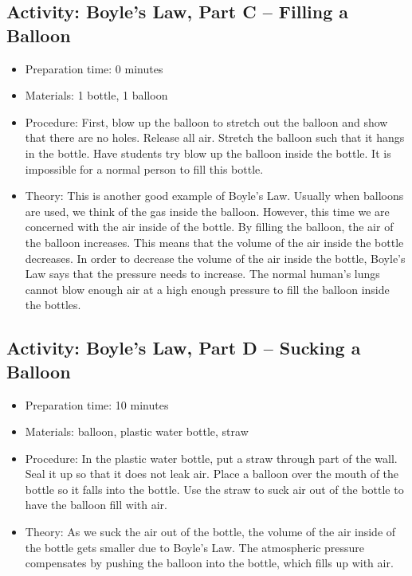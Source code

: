 \begin{itemize}
{\begin{itemize}
\begin{itemize}
{\subsection{Activity: Boyle’s Law, Part C – Filling a Balloon}
\begin{itemize}
\item{Preparation time: 0 minutes}
\item{Materials: 1 bottle, 1 balloon}
\item{Procedure: First, blow up the balloon to stretch out the balloon and show that there are no holes. Release all air. Stretch the balloon such that it hangs in the bottle. Have students try blow up the balloon inside the bottle. It is impossible for a normal person to fill this bottle.}
\item{Theory: This is another good example of Boyle’s Law. Usually when balloons are used, we think of the gas inside the balloon. However, this time we are concerned with the air inside of the bottle. By filling the balloon, the air of the balloon increases. This means that the volume of the air inside the bottle decreases. In order to decrease the volume of the air inside the bottle, Boyle’s Law says that the pressure needs to increase. The normal human’s lungs cannot blow enough air at a high enough pressure to fill the balloon inside the bottles. }
\end{itemize}

\subsection{Activity: Boyle’s Law, Part D – Sucking a Balloon}
\begin{itemize}
\item{Preparation time: 10 minutes}
\item{Materials: balloon, plastic water bottle, straw}
\item{Procedure: In the plastic water bottle, put a straw through part of the wall. Seal it up so that it does not leak air. Place a balloon over the mouth of the bottle so it falls into the bottle. Use the straw to suck air out of the bottle to have the balloon fill with air.}
\item{Theory: As we suck the air out of the bottle, the volume of the air inside of the bottle gets smaller due to Boyle’s Law. The atmospheric pressure compensates by pushing the balloon into the bottle, which fills up with air.}
\end{itemize}

}
\end{itemize}
\end{itemize}}
\end{itemize}
